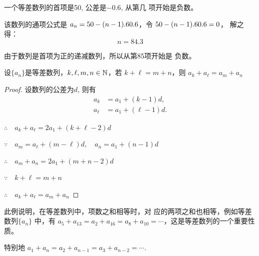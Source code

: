 \begin{example}
    一个等差数列的首项是50, 公差是$-0.6$, 从第几
项开始是负数。
\end{example}

\begin{solution}    
该数列的通项公式是
$a_n=50-(n-1).60.6$，令
$50-(n-1).60.6=0$，
解之得：$$n=84.3$$

由于数列是首项为正的递减数列，所以从第85项开始是
负数。
\end{solution}





\begin{example}
设$\{a_n\}$是等差数列，$k,\ell,m,n\in\mathbb{N}$，若
$k+\ell=m+n$，则
$a_k+a_{\ell}=a_m+a_n$
\end{example}

\begin{proof}
    设数列的公差为$d$, 则有
\[\begin{split}
     a_k&=a_1+(k-1)d,\\
a_{\ell}&=a_1+(\ell-1)d.
\end{split}\]

$\therefore\quad a_k+a_{\ell}=2a_1+(k+\ell-2)d$

$\because\quad a_m=a_{\ell}+(m-\ell)d,\quad a_n=a_1+(n-1)d$

$\therefore\quad a_m+a_n=2a_1+(m+n-2)d$

$\because\quad k+\ell=m+n$

$\therefore\quad a_k+a_{\ell}=a_m+a_n$
\end{proof}

\begin{rmk}
    此例说明，在等差数列中，项数之和相等时，对
应的两项之和也相等，例如等差数列$\{a_n\}$
中，有
$a_5+a_{13}=a_2+a_{16}=a_8+a_{10}=\cdots$，这是等差数列的一个重要性质。

特别地
$a_1+a_n=a_2+a_{n-1}=a_3+a_{n-2}=\cdots$.
\end{rmk}

